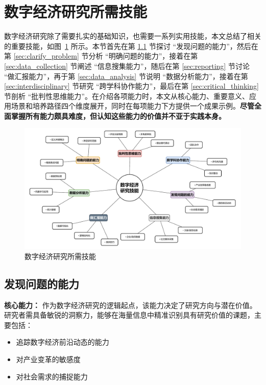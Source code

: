 \documentclass[lang=cn,12pt,a4paper]{elegantpaper}
\begin{document}
\newpage
\section {数字经济研究所需技能}\label {sec:skills}
数字经济研究除了需要扎实的基础知识，也需要一系列实用技能，本文总结了相关的重要技能，如图~\ref {fig:tech} 所示。本节首先在第 \ref {sec:problem_identification} 节探讨 “发现问题的能力”，然后在第 \ref {sec:clarify_problem} 节分析 “明确问题的能力”，接着在第 \ref {sec:data_collection} 节阐述 “信息搜集能力”，随后在第 \ref {sec:reporting} 节讨论 “做汇报能力”，再于第 \ref {sec:data_analysis} 节说明 “数据分析能力”，接着在第 \ref {sec:interdisciplinary} 节研究 “跨学科协作能力”，最后在第 \ref {sec:critical_thinking} 节剖析 “批判性思维能力”。在介绍各项能力时，本文从核心能力、重要意义、应用场景和培养路径四个维度展开，同时在每项能力下方提供一个成果示例。\textbf{尽管全面掌握所有能力颇具难度，但认知这些能力的价值并不亚于实践本身。}

\begin {figure}[H]
\centering
\includegraphics [width=1\linewidth]{tech.pdf}
\caption {数字经济研究所需技能}
\label {fig:tech}
\end {figure}

\subsection {发现问题的能力}\label {sec:problem_identification}
\textbf {核心能力：} 作为数字经济研究的逻辑起点，该能力决定了研究方向与潜在价值。研究者需具备敏锐的洞察力，能够在海量信息中精准识别具有研究价值的课题，主要包括：
\begin {itemize}
\item 追踪数字经济前沿动态的能力
\item 对产业变革的敏感度
\item 对社会需求的捕捉能力
\end {itemize}
\end{document}
